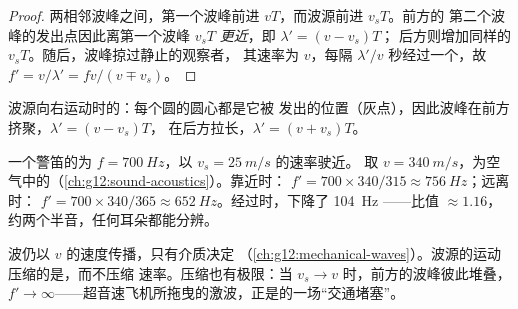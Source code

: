 \begin{proof}
两相邻波峰之间，第一个波峰前进 $vT$，而波源前进 $v_s T$。前方的
第二个波峰的发出点因此离第一个波峰 $v_s T$ \emph{更近}，即 $\lambda' = (v - v_s)T$；
后方则增加同样的 $v_s T$。随后，波峰掠过静止的观察者，
其速率为 $v$，每隔 $\lambda'/v$ 秒经过一个，故 $f' = v/\lambda' = f v/(v \mp v_s)$。
\end{proof}

\begin{omfigure}

{\small 波源向右运动时的：每个圆的圆心都是它被
发出的位置（灰点），因此波峰在前方挤聚，$\lambda' = (v - v_s)T$，
在后方拉长，$\lambda' = (v + v_s)T$。}
\end{omfigure}

\begin{example}[用数字看救护车]\label{ex:g12:doppler-effect:siren}
一个警笛的为 $f = \qty{700}{Hz}$，以 $v_s = \qty{25}{m/s}$ 的速率驶近。
取 $v = \qty{340}{m/s}$，为空气中的（\cref{ch:g12:sound-acoustics}）。靠近时：
$f' = 700 \times 340/315 \approx \qty{756}{Hz}$；远离时：
$f' = 700 \times 340/365 \approx \qty{652}{Hz}$。经过时，下降了 \qty{104}{Hz}
——比值 $\approx 1.16$，约两个半音，任何耳朵都能分辨。
\end{example}

\begin{remark}[运动不改变什么]\label{rem:g12:doppler-effect:speed-unchanged}
波仍以 $v$ 的速度传播，只有介质决定
（\cref{ch:g12:mechanical-waves}）。波源的运动压缩的是\emph{}，而不压缩
速率。压缩也有极限：当 $v_s \to v$ 时，前方的波峰彼此堆叠，
$f' \to \infty$——超音速飞机所拖曳的激波，正是的一场“交通堵塞”。
\end{remark}

